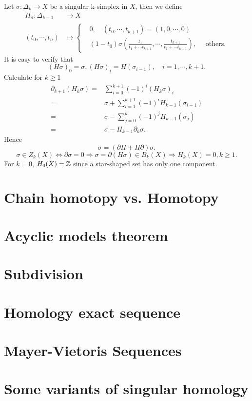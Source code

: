 Let $\sigma:\Delta_k\to X$ be a singular k-simplex in $X$, then we define
\begin{equation*}
  \begin{aligned}
    H_{\sigma}:\Delta_{k+1}&\to X\\
    (t_0,\cdots,t_n)&\mapsto 
   \left\{ \begin{aligned}
      &0,\quad (t_0,\cdots,t_{k+1})=(1,0,\cdots,0)\\
      &(1-t_0)\sigma\left( \frac{t_1}{t_1+\cdots t_{k+1}},\cdots, \frac{t_{k+1}}{t_1+\cdots t_{k+1}} \right), \quad \text{ others.} 
    \end{aligned}\right.
  \end{aligned}
\end{equation*}
It is easy to verify that 
\[
  (H\sigma)_0=\sigma,(H\sigma)_i=H(\sigma_{i-1}),\quad i=1,\cdots,k+1.
\] 
Calculate for $k\ge 1$
\begin{align*}
  \partial_{k+1}(H_k \sigma) = & \sum_{i=0}^{k+1} (-1)^{i}(H_k \sigma)_i\\
  = & \sigma + \sum_{i=1}^{k+1} (-1)^{i}H_{k-1}(\sigma_{i-1})\\
  = & \sigma -\sum_{j=0}^{k} (-1)^{j}H_{k-1}(\sigma_j)\\
  = & \sigma - H_{k-1}\partial_{k}\sigma.
\end{align*}
Hence 
\[
  \sigma=\left( \partial H+H\partial \right) \sigma.
\] 
\[
  \sigma \in Z_{k}(X)\Leftrightarrow\partial\sigma=0\Rightarrow \sigma=\partial(H\sigma)\in B_k(X)\Rightarrow H_{k}(X)=0,k \ge 1.
\] 
For $k=0$,  $H_0(X)=\mathbb{Z}$ since a star-shaped set has only one component.
\section{Chain homotopy vs. Homotopy}
\section{Acyclic models theorem}
\section{Subdivision}
\section{Homology exact sequence}
\section{Mayer-Vietoris Sequences}
\section{Some variants of singular homology}






